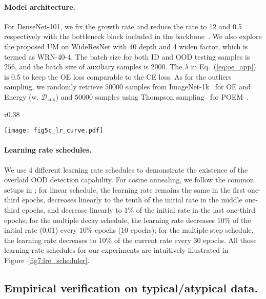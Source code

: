 \documentclass{article}
\theoremstyle{plain}
\theoremstyle{definition}
\theoremstyle{remark}
\begin{document}
\paragraph{Model architecture.} For DenseNet-101, we fix the growth rate and reduce the rate to 12 and 0.5 respectively with the bottleneck block included in the backbone~\citep{ming2022poem}. We also explore the proposed UM on WideResNet \citep{zagoruyko2016wide} with 40 depth and 4 widen factor, which is termed as WRN-40-4. The batch size for both ID and OOD testing samples is $256$, and the batch size of auxiliary samples is 2000. The $\lambda$ in Eq.~(\ref{eq:oe_app}) is 0.5 to keep the OE loss comparable to the CE loss. As for the outliers sampling, we randomly retrieve $50000$ samples from ImageNet-1k~\citep{deng2009imagenet} for OE and Energy (w. $\mathcal{D}_{\text{aux}}$) and $50000$ samples using Thompson sampling~\citep{thompson} for POEM~\citep{ming2022poem}.

\begin{wrapfigure}{r}{0.38\textwidth}
  \begin{center}
    \texttt{[image: fig5c\_lr\_curve.pdf]}
    \end{center}
    \vspace{-2mm}
    \caption{Learning Rate Scheduler.}
    \label{fig7:lre_scheduler}
\end{wrapfigure}
\paragraph{Learning rate schedules.} We use 4 different learning rate schedules to demonstrate the existence of the overlaid OOD detection capability. For cosine annealing, we follow the common setups in \citet{LoshchilovH17}; for linear schedule, the learning rate remains the same in the first one-third epochs, decreases linearly to the tenth of the initial rate in the middle one-third epochs, and decrease linearly to $1\%$ of the initial rate in the last one-third epochs; for the multiple decay schedule, the learning rate decreases $10\%$ of the initial rate ($0.01$) every $10\%$ epochs ($10$ epochs); for the multiple step schedule, the learning rate decreases to $10\%$ of the current rate every $30$ epochs. All those learning rate schedules for our experiments are intuitively illustrated in Figure~\ref{fig7:lre_scheduler}.


\subsection{Empirical verification on typical/atypical data.}
\label{app:exp_typical_atypical}
\end{document}
